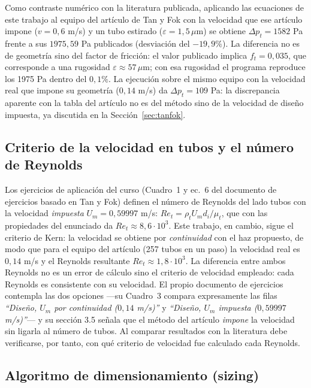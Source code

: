 \documentclass[11pt,a4paper]{article}
\begin{document}
Como contraste num\'erico con la literatura publicada, aplicando las
ecuaciones de este trabajo al equipo del art\'iculo de Tan y Fok con la
velocidad que ese art\'iculo impone ($v = 0{,}6$ m/s) y un tubo 
estirado ($\varepsilon = 1{,}5\,\mu$m) se obtiene 
$\Delta p_t = 1582$ Pa frente a sus $1975{,}59$ Pa publicados 
(desviaci\'on del $-19{,}9\%$). La diferencia no es de geometr\'ia sino 
del factor de fricci\'on: el valor publicado implica $f_t = 0{,}035$, que 
corresponde a una rugosidad $\varepsilon \approx 57\,\mu$m; con esa 
rugosidad el programa reproduce los 1975 Pa dentro del $0{,}1\%$. 
La ejecuci\'on sobre el mismo equipo con la velocidad real que impone 
su geometr\'ia ($0{,}14$ m/s) da $\Delta p_t = 109$ Pa: la discrepancia aparente con la tabla del
art\'iculo no es del m\'etodo sino de la velocidad de dise\~no impuesta,
ya discutida en la Secci\'on~\ref{sec:tanfok}.


\subsection{Criterio de la velocidad en tubos y el n\'umero de Reynolds}

Los ejercicios de aplicaci\'on del curso (Cuadro~1 y ec.~6 del documento de
ejercicios basado en Tan y Fok) definen el n\'umero de Reynolds del lado
tubos con la velocidad \emph{impuesta} $U_m = 0{,}59997$ m/s:
$Re_t = \rho_t U_m d_i / \mu_t$, que con las propiedades del enunciado da
$Re_t \approx 8{,}6\cdot 10^3$. Este trabajo, en cambio, sigue el criterio
de Kern: la velocidad se obtiene por \emph{continuidad} con el haz propuesto,
de modo que para el equipo del art\'iculo (257 tubos en un paso) la velocidad
real es $0{,}14$ m/s y el Reynolds resultante $Re_t \approx 1{,}8\cdot
10^3$. La diferencia entre ambos Reynolds no es un error de c\'alculo sino el
criterio de velocidad empleado: cada Reynolds es consistente con su velocidad.
El propio documento de ejercicios contempla las dos opciones ---su Cuadro~3
compara expresamente las filas \emph{``Dise\~no, $U_m$ por continuidad
($0{,}14$ m/s)''} y \emph{``Dise\~no, $U_m$ impuesta ($0{,}59997$
m/s)''}--- y su secci\'on 3.5 se\~nala que el m\'etodo del art\'iculo
\emph{impone} la velocidad sin ligarla al n\'umero de tubos. Al comparar
resultados con la literatura debe verificarse, por tanto, con qu\'e criterio
de velocidad fue calculado cada Reynolds.

\subsection{Algoritmo de dimensionamiento (sizing)}
\end{document}
